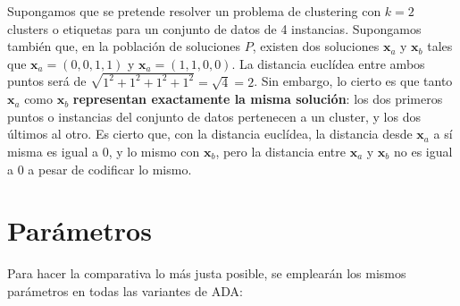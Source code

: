 Supongamos que se pretende resolver un problema de clustering con $k=2$ clusters o etiquetas para un conjunto de datos de 4 instancias. Supongamos también que, en la población de soluciones $P$, existen dos soluciones $\textbf{x}_a$ y $\textbf{x}_b$ tales que $\textbf{x}_a = (0,0,1,1)$ y $\textbf{x}_a = (1,1,0,0)$. La distancia euclídea entre ambos puntos será de $\sqrt{1^2+1^2+1^2+1^2} = \sqrt{4} = 2$. Sin embargo, lo cierto es que tanto $\textbf{x}_a$ como $\textbf{x}_b$ \textbf{representan exactamente la misma solución}: los dos primeros puntos o instancias del conjunto de datos pertenecen a un cluster, y los dos últimos al otro. Es cierto que, con la distancia euclídea, la distancia desde $\textbf{x}_a$ a sí misma es igual a $0$, y lo mismo con $\textbf{x}_b$, pero la distancia entre $\textbf{x}_a$ y $\textbf{x}_b$ no es igual a $0$ a pesar de codificar lo mismo.




\section{Parámetros}

Para hacer la comparativa lo más justa posible, se emplearán los mismos parámetros en todas las variantes de ADA:

